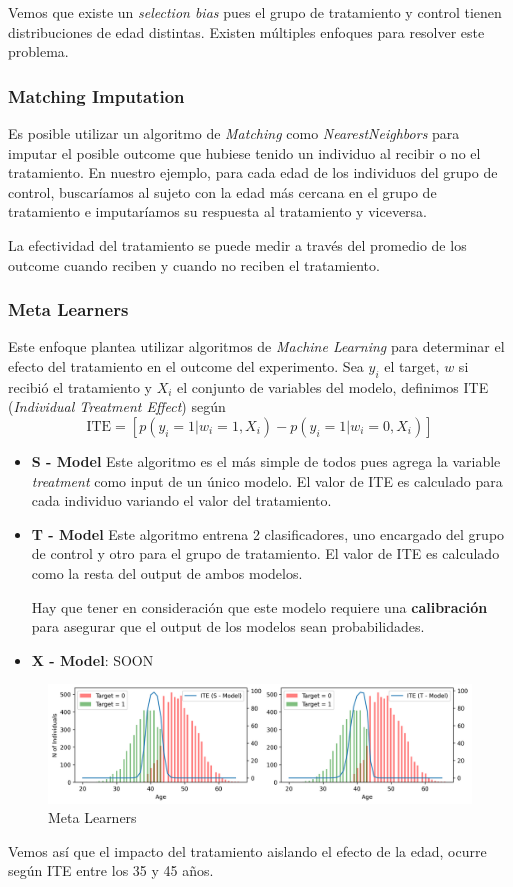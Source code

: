 Vemos que existe un \textit{selection bias} pues el grupo de tratamiento y control tienen distribuciones de edad distintas. Existen múltiples enfoques para resolver este problema. 

\subsubsection{Matching Imputation}

Es posible utilizar un algoritmo de \textit{Matching} como \textit{NearestNeighbors} para imputar el posible outcome que hubiese tenido un individuo al recibir o no el tratamiento. En nuestro ejemplo, para cada edad de los individuos del grupo de control, buscaríamos al sujeto con la edad más cercana en el grupo de tratamiento e imputaríamos su respuesta al tratamiento y viceversa. 

La efectividad del tratamiento se puede medir a través del promedio de los outcome cuando reciben y cuando no reciben el tratamiento. 

\subsubsection{Meta Learners}

Este enfoque plantea utilizar algoritmos de \textit{Machine Learning} para determinar el efecto del tratamiento en el outcome del experimento. Sea $y_i$ el target, $w$ si recibió el tratamiento y $X_i$ el conjunto de variables del modelo, definimos ITE (\textit{Individual Treatment Effect}) según 
$$
\text{ITE} = \left [ p(y_i = 1 | w_i = 1, X_i) - p(y_i = 1 | w_i = 0, X_i) \right ]
$$

\begin{itemize}
    \item \textbf{S - Model} Este algoritmo es el más simple de todos pues agrega la variable \textit{treatment} como input de un único modelo. El valor de ITE es calculado para cada individuo variando el valor del tratamiento. 
    \item \textbf{T - Model} Este algoritmo entrena 2 clasificadores, uno encargado del grupo de control y otro para el grupo de tratamiento. El valor de ITE es calculado como la resta del output de ambos modelos. 

    Hay que tener en consideración que este modelo requiere una \textbf{calibración} para asegurar que el output de los modelos sean probabilidades.
    \item \textbf{X - Model}: SOON 
\end{itemize}


\begin{figure}[H]
    \center
    \includegraphics[scale=0.5]{notebooks/STATS/img/causal_inference_meta_learners.png}
    \caption{Meta Learners}
\end{figure}

Vemos así que el impacto del tratamiento aislando el efecto de la edad, ocurre según ITE entre los 35 y 45 años. 





